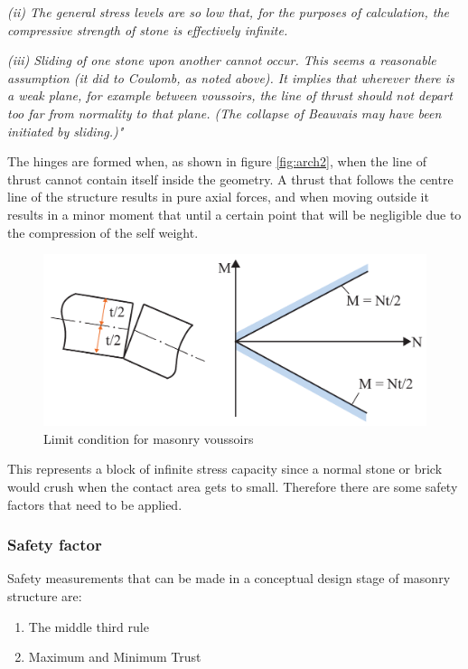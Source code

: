 \textit{(ii) The general stress levels are so low that, for the purposes of calculation, the compressive strength of stone is effectively infinite. }

\textit{(iii) Sliding of one stone upon another cannot occur. This seems a reasonable assumption
(it did to Coulomb, as noted above). It implies that wherever there is a weak plane, for
example between voussoirs, the line of thrust should not depart too far from normality
to that plane. (The collapse of Beauvais may have been initiated by sliding.)" }

The hinges are formed when, as shown in figure \ref{fig:arch2}, when the line of thrust cannot contain itself inside the geometry. A thrust that follows the centre line of the structure results in pure axial forces, and when moving outside it results in a minor moment that until a certain point that will be negligible due to the compression of the self weight.

\begin{figure}[H]
\centering
\includegraphics[width=0.9\linewidth ]{figure/Theory/Plasticity.pdf}
\caption{Limit condition for masonry voussoirs \cite{ref:Heyman2}}
\end{figure}

This represents a block of infinite stress capacity since a normal stone or brick would crush when the contact area gets to small. Therefore there are some safety factors that need to be applied.


\subsubsection{Safety factor}

Safety measurements that can be made in a conceptual design stage of masonry structure are:

\begin{enumerate}
\item The middle third rule
\item Maximum and Minimum Trust
\end{enumerate}

